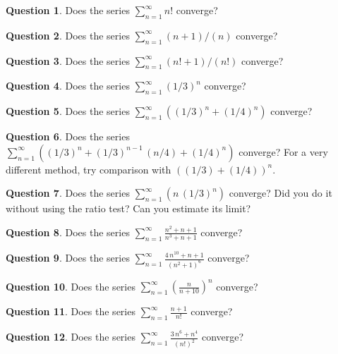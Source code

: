 \documentclass[12pt]{article}
\theoremstyle{definition}
\newtheorem{question}{Question}
\newcommand{\sumn}{\displaystyle\sum_{n=1}^{\infty}}
\begin{document}
\begin{question}
Does the series $\sumn n!$ converge?
\end{question}

\begin{question}
Does the series $\sumn ( n + 1 )/(n)$ converge?
\end{question}

\begin{question}
Does the series $\sumn ( n! + 1 )/(n!)$ converge?
\end{question}

\begin{question}
Does the series $\sumn (1/3)^n$ converge?
\end{question}

\begin{question}
Does the series $\sumn \left( (1/3)^n + (1/4)^n \right)$ converge?
\end{question}

\begin{question}
  Does the series $\sumn \left( (1/3)^n + (1/3)^{n-1} \,(n/4) +
    (1/4)^n \right)$ converge?  For a very different method, try comparison with $\left( (1/3) +
    (1/4) \right)^n$.
\end{question}

\begin{question}
  Does the series $\sumn \left( n \, (1/3)^n \right)$ converge?  Did
  you do it without using the ratio test?  Can you estimate its limit?
\end{question}

\begin{question}
Does the series $\sumn \displaystyle\frac{n^2 + n + 1}{n^3 + n + 1}$ converge?
\end{question}

\begin{question}
Does the series $\sumn \displaystyle\frac{4\,n^{10} + n + 1}{(n^2 + 1)^6}$ converge?
\end{question}

\begin{question}
Does the series $\sumn \left( \displaystyle\frac{n}{n+10} \right)^n$ converge?
\end{question}

\begin{question}
Does the series $\sumn \displaystyle\frac{n+1}{n!}$ converge?
\end{question}

\begin{question}
Does the series $\sumn \displaystyle\frac{3\,n^6 + n^4}{(n!)^2}$ converge?
\end{question}
\end{document}

